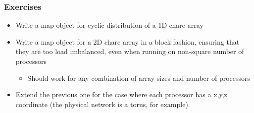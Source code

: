 \documentclass{beamer}
\begin{document}
\begin{frame}[fragile]
    \frametitle{Exercises}
    \begin{itemize}
        \item Write a map object for cyclic distribution of a 1D chare array
        \item Write a map object for a 2D chare array in a block fashion, ensuring that they are too load imbalanced, even when running on non-square number of processors
        \begin{itemize}
            \item Should work for any combination of array sizes and number of processors
        \end{itemize}
        \item Extend the previous one for the case where each processor has a x,y,z coordinate (the physical network is a torus, for example)
    \end{itemize}
\end{frame}


\end{document}
